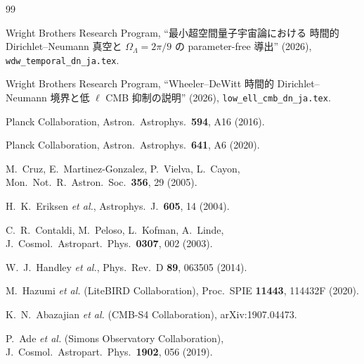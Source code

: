 \documentclass[11pt,a4paper]{article}
\begin{document}
\begin{thebibliography}{99}

Wright Brothers Research Program, ``最小超空間量子宇宙論における
時間的 Dirichlet--Neumann 真空と $\Omega_\Lambda = 2\pi/9$ の
parameter-free 導出'' (2026), \texttt{wdw\_temporal\_dn\_ja.tex}.

Wright Brothers Research Program, ``Wheeler--DeWitt 時間的
Dirichlet--Neumann 境界と低 $\ell$ CMB 抑制の説明'' (2026),
\texttt{low\_ell\_cmb\_dn\_ja.tex}.

Planck Collaboration, Astron.\ Astrophys.\ \textbf{594}, A16 (2016).

Planck Collaboration, Astron.\ Astrophys.\ \textbf{641}, A6 (2020).

M.~Cruz, E.~Martinez-Gonzalez, P.~Vielva, L.~Cayon,
Mon.\ Not.\ R.\ Astron.\ Soc.\ \textbf{356}, 29 (2005).

H.~K.~Eriksen \textit{et al.}, Astrophys.\ J.\ \textbf{605}, 14 (2004).

C.~R.~Contaldi, M.~Peloso, L.~Kofman, A.~Linde,
J.\ Cosmol.\ Astropart.\ Phys.\ \textbf{0307}, 002 (2003).

W.~J.~Handley \textit{et al.}, Phys.\ Rev.\ D \textbf{89}, 063505 (2014).

M.~Hazumi \textit{et al.} (LiteBIRD Collaboration), Proc.\ SPIE
\textbf{11443}, 114432F (2020).

K.~N.~Abazajian \textit{et al.} (CMB-S4 Collaboration), arXiv:1907.04473.

P.~Ade \textit{et al.} (Simons Observatory Collaboration),
J.\ Cosmol.\ Astropart.\ Phys.\ \textbf{1902}, 056 (2019).

\end{thebibliography}
\end{document}
